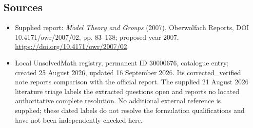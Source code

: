\documentclass[11pt]{article}
\begin{document}
\subsection{Sources}
\begin{itemize}
\item Supplied report: \emph{Model Theory and Groups} (2007), Oberwolfach Reports, DOI 10.4171/owr/2007/02, pp. 83--138; proposed year 2007. \url{https://doi.org/10.4171/owr/2007/02}.
\item Local UnsolvedMath registry, permanent ID 30000676, catalogue entry; created 25 August 2026, updated 16 September 2026. Its corrected\_verified note reports comparison with the official report. The supplied 21 August 2026 literature triage labels the extracted questions open and reports no located authoritative complete resolution. No additional external reference is supplied; these dated labels do not resolve the formulation qualifications and have not been independently checked here.
\end{itemize}
\end{document}
